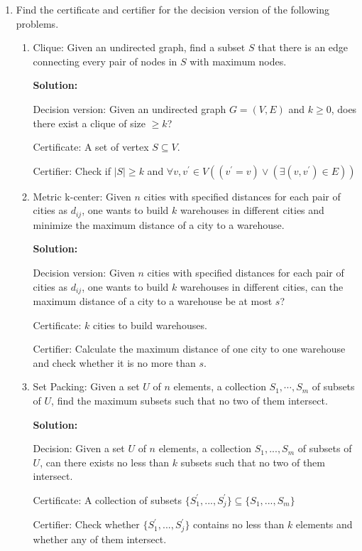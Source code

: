 \documentclass[12pt,a4paper]{article}
\theoremstyle{definition}
\numberwithin{equation}{section}
\numberwithin{figure}{section}
\begin{document}
\begin{enumerate}
  \item Find the certificate and certifier for the decision version of the following problems.
    \begin{enumerate}
      \item Clique: Given an undirected graph, find a subset $S$ that there is an edge connecting every pair of nodes in $S$ with maximum nodes.
      
      \textbf{Solution:}
      
 Decision version: Given an undirected graph $G = (V,E)$ and $k \geq 0$, does there exist a clique of size $\geq k$?
 
Certificate: A set of vertex $S \subseteq V$.
 
Certifier: Check if $|S|\geq k$ and $\forall v, v^{'} \in V((v^{'} =v) \vee ( \exists (v,v^{'}) \in E))$
      
      
      \item Metric k-center: Given $n$ cities with specified distances for each pair of cities as $d_{ij}$, one wants to build $k$ warehouses in different cities and minimize the maximum distance of a city to a warehouse.
      
      \textbf{Solution:}
      
      Decision version: Given $n$ cities with specified distances for each pair of cities as $d_{ij}$, one wants to build $k$ warehouses in different cities, can the maximum distance of a city to a warehouse be at most $s$?
      
Certificate: $k$ cities to build warehouses.
      
Certifier: Calculate the maximum distance of one city to one warehouse and check whether it is no more than $s$.
      
      \item Set Packing: Given a set $U$ of $n$ elements, a collection $S_1, \cdots, S_m$ of
subsets of $U$, find the maximum subsets such that no two of them intersect.

    \textbf{Solution:}
    
    Decision: Given a set $U$ of $n$ elements, a collection $S_1, ... , S_m$ of subsets of $U$, can there exists no less than $k$ subsets such that no two of them intersect.
    
Certificate: A collection of subsets $\{S_1^{'} , ... , S_j^{'} \} \subseteq \{S_1, ... , S_m\}$
    
Certifier: Check whether $\{S_1^{'} , ... , S_j^{'} \}$ contains no less than $k$ elements and whether any of them intersect.
    


\end{enumerate}
\end{enumerate}
\end{document}
